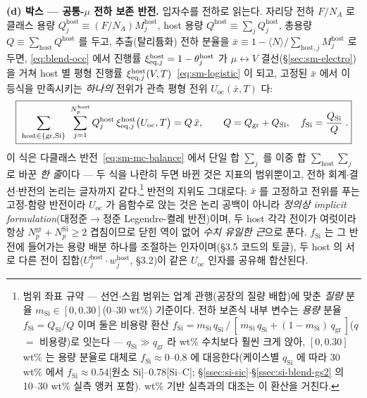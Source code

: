 \textbf{(d) 박스 --- 공통-$\mu$ 전하 보존 반전.} 입자수를 전하로 읽는다. 자리당 전하 $F/N_A$ 로 클래스
용량 $Q_j^\mathrm{host}\equiv(F/N_A)M_j^\mathrm{host}$, host 용량
$Q^\mathrm{host}\equiv\sum_jQ_j^\mathrm{host}$, 총용량 $Q\equiv\sum_\mathrm{host}Q^\mathrm{host}$ 를
두고, 추출(탈리튬화) 전하 분율을 $\bar x\equiv1-\langle N\rangle/\sum_{\mathrm{host},j}M_j^\mathrm{host}$
로 두면, \eqref{eq:blend-occ} 에서 진행률 $\xi_{\mathrm{eq},j}^\mathrm{host}=1-\theta_j^\mathrm{host}$ 가
$\mu\leftrightarrow V$ 결선(\S\ref{sec:sm-electro})을 거쳐 host 별 평형 진행률
$\xi_{\mathrm{eq},j}^\mathrm{host}(V,T)$~\eqref{eq:sm-logistic} 이 되고, 고정된 $\bar x$ 에서 이 등식을
만족시키는 \emph{하나의} 전위가 관측 평형 전위 $U_\mathrm{oc}(\bar x,T)$ 다:
\begin{equation}
\boxed{\;\sum_{\mathrm{host}\in\{\mathrm{gr},\mathrm{Si}\}}\ \sum_{j=1}^{N_p^\mathrm{host}}
Q_j^\mathrm{host}\,\xi_{\eq,j}^\mathrm{host}\bigl(U_\mathrm{oc},T\bigr)=Q\,\bar x,
\qquad
Q=Q_\mathrm{gr}+Q_\mathrm{Si},\quad f_\mathrm{Si}=\frac{Q_\mathrm{Si}}{Q}\;.}
\label{eq:blend-balance}
\end{equation}
이 식은 다클래스 반전~\eqref{eq:sm-mc-balance} 에서 단일 합 $\sum_j$ 를 이중 합
$\sum_\mathrm{host}\sum_j$ 로 바꾼 \emph{한 줄}이다 --- 두 식을 나란히 두면 바뀐 것은 지표의 범위뿐이고,
전하 회계$\cdot$결선$\cdot$반전의 논리는 글자까지 같다.\footnote{범위 좌표 규약 --- 선언$\cdot$스윕 범위는 업계 관행(공장의 질량 배합)에 맞춘 \emph{질량} 분율
$m_\mathrm{Si}\in[0,0.30]$(0--30 wt\%) 기준이다. 전하 보존식 내부 변수는 \emph{용량} 분율
$f_\mathrm{Si}=Q_\mathrm{Si}/Q$ 이며 둘은 비용량 환산
$f_\mathrm{Si}=m_\mathrm{Si}\,q_\mathrm{Si}\,/\,[\,m_\mathrm{Si}\,q_\mathrm{Si}+(1-m_\mathrm{Si})\,q_\mathrm{gr}\,]$($q$ $=$ 비용량)로
잇는다 --- $q_\mathrm{Si}\gg q_\mathrm{gr}$ 라 wt\% 수치보다 훨씬 크게 앉아, $[0,0.30]$ wt\% 는 용량 분율로
대체로 $f_\mathrm{Si}\approx0$--$0.8$ 에 대응한다(케이스별 $q_\mathrm{Si}$ 에 따라 30 wt\% 에서 $f_\mathrm{Si}{\approx}0.54$[원소 Si]--$0.78$[Si--C]; \S\ref{ssec:si-sic}$\cdot$\S\ref{ssec:si-blend-gs2} 의
10--30 wt\% 실측 앵커 포함). wt\% 기반 실측과의 대조는 이 환산을 거친다.} 반전의 지위도 그대로다: $\bar x$ 를 고정하고
전위를 푸는 고정-함량 반전이라 $U_\mathrm{oc}$ 가 음함수로 앉는 것은 논리 공백이 아니라 \emph{정의상
implicit formulation}(대정준$\to$정준 Legendre-켤레 반전)이며, 두 host 각각 전이가 여럿이라 항상
$N_p^\mathrm{gr}+N_p^\mathrm{Si}\ge2$ 겹침이므로 닫힌 역이 없어 \emph{수치 유일한 근}으로 푼다. $f_\mathrm{Si}$
는 그 반전에 들어가는 용량 배분 하나를 조절하는 인자이며(§3.5 코드의 토글), 두 host 의 서로 다른 전이
집합($U_j^\mathrm{host}\cdot w_j^\mathrm{host}$, §3.2)이 같은 $U_\mathrm{oc}$ 인자를 공유해 합산된다.
